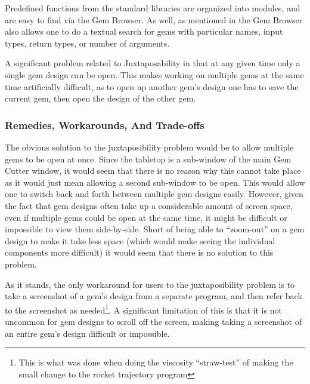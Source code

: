 Predefined functions from the standard libraries are organized into modules, and are easy to find via the Gem Browser.  As well, as mentioned in  the Gem Browser also allows one to do a textual search for gems with particular names, input types, return types, or number of arguments.

A significant problem related to Juxtaposability in that at any given time only a single gem design can be open.  This makes working on multiple gems at the same time artificially difficult, as to open up another gem's design one has to save the current gem, then open the design of the other gem.

\subsubsection{Remedies, Workarounds, And Trade-offs}

The obvious solution to the juxtaposibility problem would be to allow multiple gems to be open at once.  Since the tabletop is a sub-window of the main Gem Cutter window, it would seem that there is no reason why this cannot take place as it would just mean allowing a second sub-window to be open.  This would allow one to switch back and forth between multiple gem designs easily.  However, given the fact that gem designs often take up a considerable amount of screen space, even if multiple gems could be open at the same time, it might be difficult or impossible to view them side-by-side.  Short of being able to ``zoom-out'' on a gem design to make it take less space (which would make seeing the individual components more difficult) it would seem that there is no solution to this problem.

As it stands, the only workaround for users to the juxtaposibility problem is to take a screenshot of a gem's design from a separate program, and then refer back to the screenshot as needed\footnote{This is what was done when doing the viscosity ``straw-test'' of making the small change to the rocket trajectory program}.  A significant limitation of this is that it is not uncommon for gem designs to scroll off the screen, making taking a screenshot of an entire gem's design difficult or impossible.

